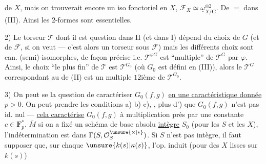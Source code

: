  de $X$, mais on trouverait encore
un iso fonctoriel en $X$, $\mathcal{F}_X\simeq\underline{\omega}_{X/\mathbf{C}}^{\otimes2}$.
De $=$ dans (III). Ainsi les $2$-formes sont essentielles.

2)  Le torseur $\mathcal{T}$ dont il est question dans
II (et  dans I) dépend du choix de
$G$ (et de $\mathcal{F}$, si on veut --- c'est alors un
torseur sous $\mathcal{F}$) mais les  différents choix
sont can. (semi)-isomorphes, de façon précise
i.e. $\mathcal{T}^{\varphi G}$ est ``multiple'' de $\mathcal{T}^{G}$ par $\varphi$.
Ainsi, le choix ``le plus fin'' de $\mathcal{T}$ est $\mathcal{T}^{G_0}$
(où $G_0$ est défini en (III)), alors le $\mathcal{T}^{G}$
correspondant au   de (II) est un
multiple $12$ième de $\mathcal{T}^{G_0}$.

3) On peut se  la question
de caractériser $G_0(f,g)$ \uline{en une caractéristique donnée} $p>0$.
On peut prendre les conditions
a) b) c), , plus d') que $G_0(f,g)$ n'est pas id. nul
--- \uline{cela caractérise} $G_0(f,g)$ à multiplication près
par une constante $c\in\mathbf{F}_p^{*}$.
$\bar{M}$  si
on a fixé un schéma de base absolu
\uline{intègre} $S_0$ (pour les $S$ et les $X$), l'indétermination
est dans $\Gamma(S,\mathcal{O}_S^{\unsure{\times|*}})$.
Si $S$ n'est pas intègre, il faut supposer que, sur chaque
$\unsure{k(s)|\kappa(s)}$, l'op. induit (pour des $X$ lisses
 sur $k(s)$)


